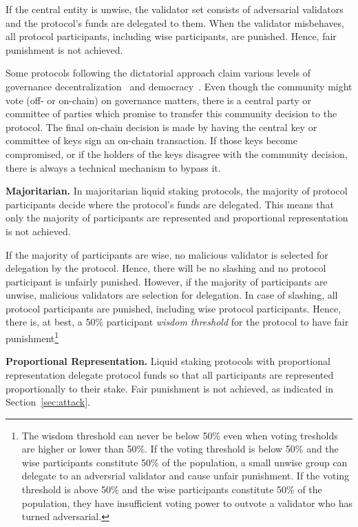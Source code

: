 If the central entity is unwise, the validator set
consists of adversarial validators and the protocol's funds are delegated
to them. When the validator misbehaves,
all protocol participants, including wise participants, are punished.
Hence, fair punishment is not achieved.

Some protocols following the dictatorial approach claim various levels of
governance decentralization~\cite{???} and democracy~\cite{parallel}. %
Even though the community might vote (off- or on-chain)
on governance matters, there is a central party or committee of parties
which promise to transfer this community decision to the protocol.
The final on-chain decision
is made by having the central key or committee of keys sign an on-chain transaction.
If those keys become compromised, or if the holders of the keys disagree with the community
decision, there is always a technical mechanism to bypass it.

\noindent
\textbf{Majoritarian.}
In majoritarian liquid staking protocols,
the majority of protocol participants decide where the protocol's
funds are delegated. This means that only the majority of participants
are represented and proportional representation is not achieved.

If the majority of participants are wise, no malicious validator is
selected for delegation by the protocol. Hence, there will be no slashing and no
protocol participant is unfairly punished.
However, if the majority of participants are unwise, malicious validators
are selection for delegation. In case of slashing, all protocol participants
are punished, including wise protocol participants.
Hence, there is, at best, a 50\% participant \emph{wisdom threshold} for the protocol
to have fair punishment\footnote{The wisdom threshold can never be below 50\%
even when voting tresholds are higher or lower than 50\%.
If the voting threshold is below 50\% and the wise participants constitute
50\% of the population, a small unwise group
can delegate to an adversrial validator and cause unfair punishment.
If the voting threshold is above 50\% and the wise participants constitute
50\% of the population, they have insufficient voting power to outvote a
validator who has turned adversarial.}


\noindent
\textbf{Proportional Representation.}
Liquid staking protocols with proportional representation delegate
protocol funds so that all participants are represented proportionally
to their stake. Fair punishment is not achieved, as indicated in
Section~\ref{sec:attack}.


